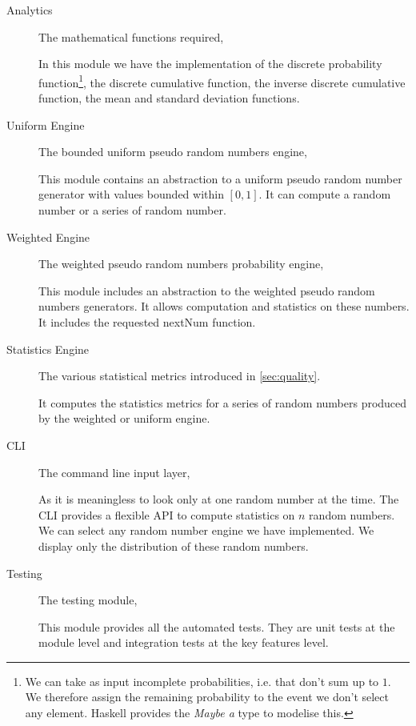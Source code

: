 \documentclass[12pt,a4paper,article]{memoir} %
\begin{document}
\begin{description}
	\item[Analytics] The mathematical functions required,
	
	In this module we have the implementation of the discrete 
	probability function\footnote{
	We can take as input incomplete probabilities, i.e. that
	don't sum up to $1$. We therefore assign the remaining
	probability to the event we don't select any element.
	Haskell provides the \emph{Maybe a} type to modelise this.
	}, the discrete cumulative function, 
	the inverse discrete cumulative function, the mean and
	standard deviation functions.
	
	\item[Uniform Engine] The bounded uniform 
	pseudo random numbers engine,
	
	This module contains an abstraction to a uniform pseudo
	random number generator with values bounded 
	within $ \left[ 0, 1 \right]$.
	It can compute a random number or a series of random 
	number.
	
	\item[Weighted Engine] 	The weighted pseudo random 
	numbers probability engine,
	
	This module includes an abstraction to the weighted 
	pseudo random numbers generators.
	It allows computation and statistics on these numbers.
	It includes the requested nextNum function.
	\item[Statistics Engine] The various statistical metrics
	introduced in \autoref{sec:quality}.
	
	It computes the statistics metrics for a series of 
	random numbers produced by the weighted or
	uniform engine.
	\item[CLI] 		The command line input layer,
	
	As it is meaningless to look only at one random number at the time.
	The CLI provides a flexible API to compute
	statistics on $n$ random numbers.
	We can select any random number engine we have implemented.
	We display only the distribution of these random numbers.
	\item[Testing] 	The testing module,
	
	This module provides all the automated tests. They are unit 
	tests at the module level and integration tests at the key
	features level.
\end{description}
\end{document}
